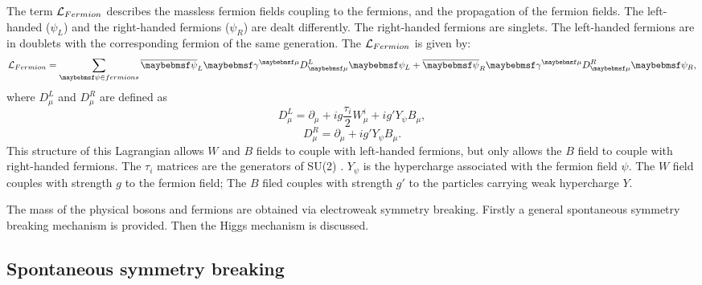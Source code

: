 The term $\operatorname{\mathcal{L}}_{Fermion}$ describes the massless fermion fields coupling to the fermions, and the propagation of the fermion fields. The left-handed ($ \psi_L $) and the right-handed fermions ($ \psi_R $) are dealt differently. The right-handed fermions are singlets. The left-handed fermions are in doublets with the corresponding fermion of the same generation. The $\operatorname{\mathcal{L}}_{Fermion}$ is given by:
\begin{equation}
\Lagr_{Fermion} = \sum_{\psi\in{fermions}} {\overline{\psi}}_L \gamma^{\mu}D^L_{\mu} \psi_L +  \overline{\psi}_R \gamma^{\mu}D^R_{\mu} \psi_R ,
\end{equation}
where $D^L_{\mu}$ and $D^R_{\mu}$ are defined as
\begin{equation}
D^L_{\mu} = \partial_{\mu} + ig\frac{\tau_i}{2}W^i_{\mu} + ig'Y_{\psi}B_{\mu} ,
\end{equation}
\begin{equation}
D^R_{\mu} = \partial_{\mu}  + ig'Y_{\psi}B_{\mu} .
\end{equation}
This structure of this Lagrangian allows $W$ and $B$ fields to couple with left-handed fermions, but only allows the $B$ field to couple with right-handed fermions. The $\tau_i$ matrices are the generators of SU(2) . $Y_{\psi}$ is the hypercharge associated with the fermion field $\psi$. The $W$ field couples with strength $g$ to the fermion field;  The $B$ filed couples with strength $g'$ to the particles carrying weak hypercharge $Y$.



The mass of the physical bosons and fermions are obtained via electroweak symmetry breaking. Firstly a general   spontaneous symmetry breaking mechanism is provided. Then the Higgs mechanism is discussed.

\subsection{Spontaneous symmetry breaking}

